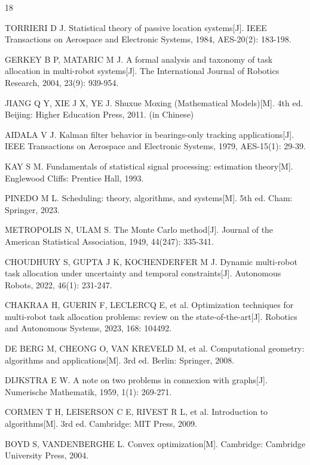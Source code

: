 \begin{thebibliography}{18}
\setlength{\itemsep}{0pt}\setlength{\parsep}{0pt}

 TORRIERI D J. Statistical theory of passive location systems[J]. IEEE Transactions on Aerospace and Electronic Systems, 1984, AES-20(2): 183-198.

 GERKEY B P, MATARIC M J. A formal analysis and taxonomy of task allocation in multi-robot systems[J]. The International Journal of Robotics Research, 2004, 23(9): 939-954.

 JIANG Q Y, XIE J X, YE J. Shuxue Moxing (Mathematical Models)[M]. 4th ed. Beijing: Higher Education Press, 2011. (in Chinese)

 AIDALA V J. Kalman filter behavior in bearings-only tracking applications[J]. IEEE Transactions on Aerospace and Electronic Systems, 1979, AES-15(1): 29-39.

 KAY S M. Fundamentals of statistical signal processing: estimation theory[M]. Englewood Cliffs: Prentice Hall, 1993.

 PINEDO M L. Scheduling: theory, algorithms, and systems[M]. 5th ed. Cham: Springer, 2023.

 METROPOLIS N, ULAM S. The Monte Carlo method[J]. Journal of the American Statistical Association, 1949, 44(247): 335-341.

 CHOUDHURY S, GUPTA J K, KOCHENDERFER M J. Dynamic multi-robot task allocation under uncertainty and temporal constraints[J]. Autonomous Robots, 2022, 46(1): 231-247.

 CHAKRAA H, GUERIN F, LECLERCQ E, et al. Optimization techniques for multi-robot task allocation problems: review on the state-of-the-art[J]. Robotics and Autonomous Systems, 2023, 168: 104492.

 DE BERG M, CHEONG O, VAN KREVELD M, et al. Computational geometry: algorithms and applications[M]. 3rd ed. Berlin: Springer, 2008.

 DIJKSTRA E W. A note on two problems in connexion with graphs[J]. Numerische Mathematik, 1959, 1(1): 269-271.

 CORMEN T H, LEISERSON C E, RIVEST R L, et al. Introduction to algorithms[M]. 3rd ed. Cambridge: MIT Press, 2009.

 BOYD S, VANDENBERGHE L. Convex optimization[M]. Cambridge: Cambridge University Press, 2004.


\end{thebibliography}
